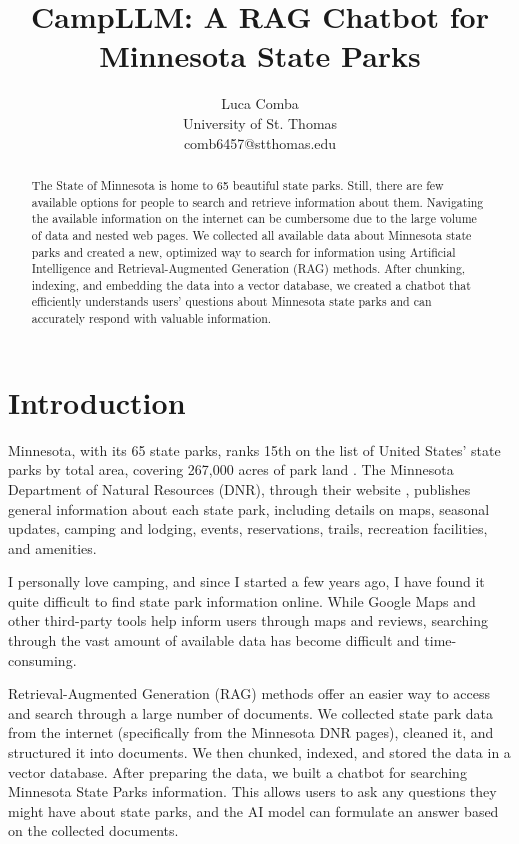 \documentclass[11pt]{article}
\title{CampLLM: A RAG Chatbot for Minnesota State Parks}
\author{Luca Comba \\
  University of St. Thomas \\ comb6457@stthomas.edu \\}
\begin{document}
\maketitle
\begin{abstract}
The State of Minnesota is home to 65 beautiful state parks. Still, there are few available options for people to search and retrieve information about them. Navigating the available information on the internet can be cumbersome due to the large volume of data and nested web pages. We collected all available data about Minnesota state parks and created a new, optimized way to search for information using Artificial Intelligence and Retrieval-Augmented Generation (RAG) methods. After chunking, indexing, and embedding the data into a vector database, we created a chatbot that efficiently understands users' questions about Minnesota state parks and can accurately respond with valuable information.
\end{abstract}

\section{Introduction}
Minnesota, with its 65 state parks, ranks 15th on the list of United States' state parks by total area, covering 267,000 acres of park land \cite{rankings}. The Minnesota Department of Natural Resources (DNR), through their website \cite{dnr}, publishes general information about each state park, including details on maps, seasonal updates, camping and lodging, events, reservations, trails, recreation facilities, and amenities.

I personally love camping, and since I started a few years ago, I have found it quite difficult to find state park information online. While Google Maps and other third-party tools help inform users through maps and reviews, searching through the vast amount of available data has become difficult and time-consuming.

Retrieval-Augmented Generation (RAG) methods offer an easier way to access and search through a large number of documents. We collected state park data from the internet (specifically from the Minnesota DNR pages), cleaned it, and structured it into documents. We then chunked, indexed, and stored the data in a vector database. After preparing the data, we built a chatbot for searching Minnesota State Parks information. This allows users to ask any questions they might have about state parks, and the AI model can formulate an answer based on the collected documents.
\end{document}
